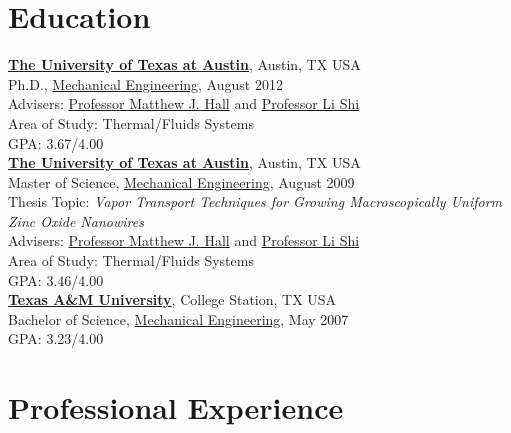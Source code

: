 \documentclass[centered]{res}
\begin{document}
\begin{resume}
\section{Education}
%
\href{http://www.utexas.edu/}{\textbf{The University of Texas at
    Austin}}, Austin, TX USA \\
Ph.D., \href{http://www.me.utexas.edu/}{Mechanical Engineering},
August 2012 \\
Advisers:
\href{http://www.me.utexas.edu/directory/faculty/hall/matthew/33/}{Professor
  Matthew J. Hall} and \href{http://www.me.utexas.edu/~lishi/}{Professor Li Shi}\\
Area of Study: Thermal/Fluids Systems \\
GPA: 3.67/4.00 \\
%
\href{http://www.utexas.edu/}{\textbf{The University of Texas at
    Austin}}, Austin, TX USA \\
Master of Science, \href{http://www.me.utexas.edu/}{Mechanical
  Engineering}, August
2009 \\
Thesis Topic: \emph{Vapor Transport Techniques for Growing
  Macroscopically Uniform Zinc Oxide Nanowires} \\
Advisers:
\href{http://www.me.utexas.edu/directory/faculty/hall/matthew/33/}{Professor
  Matthew J. Hall} and \href{http://www.me.utexas.edu/~lishi/}{Professor Li Shi}\\
Area of Study: Thermal/Fluids Systems \\
GPA: 3.46/4.00\\
%
\href{http://www.tamu.edu/}{\textbf{Texas A\&M University}}, College
Station, TX USA \\
Bachelor of Science, \href{http://www.mengr.tamu.edu/}{Mechanical
  Engineering}, May
2007  \\
GPA: 3.23/4.00

\section{Professional Experience}


\end{resume}
\end{document}
